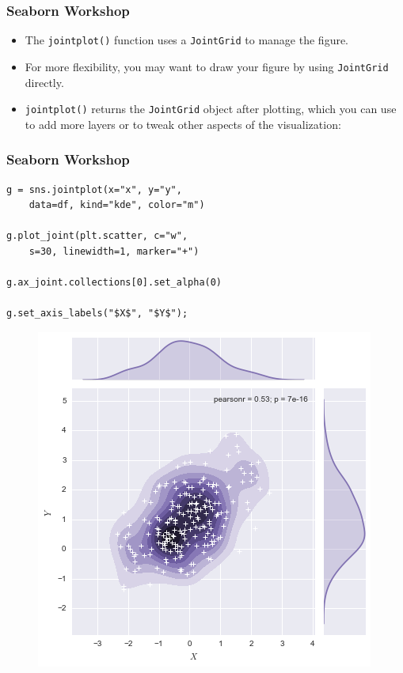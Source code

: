\documentclass{beamer}
\begin{document}
\begin{frame}[fragile]
\frametitle{Seaborn Workshop}
\large
	\begin{itemize}
\item The \texttt{jointplot()} function uses a \texttt{JointGrid} to manage the figure. \bigskip
\item For more flexibility, you may want to draw your figure by using \texttt{JointGrid} directly. \bigskip
\item  \texttt{jointplot()} returns the \texttt{JointGrid} object after plotting, which you can use to add more layers or to tweak other aspects of the visualization:
	\end{itemize}




\end{frame}
\begin{frame}[fragile]
\frametitle{Seaborn Workshop}	\large
	
\begin{framed}
\begin{verbatim}
g = sns.jointplot(x="x", y="y", 
    data=df, kind="kde", color="m")
    
g.plot_joint(plt.scatter, c="w", 
    s=30, linewidth=1, marker="+")
    
g.ax_joint.collections[0].set_alpha(0)

g.set_axis_labels("$X$", "$Y$");
\end{verbatim}
\end{framed}
\end{frame}
\begin{frame}[fragile]
	\large
	\begin{figure}
\centering
\includegraphics[width=0.55\linewidth]{images/distributions_40_0}
\end{figure}


\end{frame}
\end{document}
